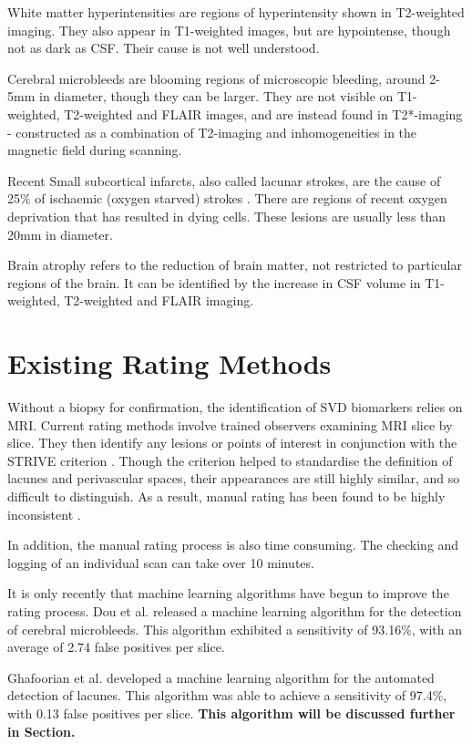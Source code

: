 White matter hyperintensities are regions of hyperintensity shown in T2-weighted imaging. They also appear in T1-weighted images, but are hypointense, though not as dark as CSF. Their cause is not well understood.

Cerebral microbleeds are blooming regions of microscopic bleeding, around 2-5mm in diameter, though they can be larger. They are not visible on T1-weighted, T2-weighted and FLAIR images, and are instead found in T2*-imaging - constructed as a combination of T2-imaging and inhomogeneities in the magnetic field during scanning. 

Recent Small subcortical infarcts, also called lacunar strokes, are the cause of 25\% of ischaemic (oxygen starved) strokes \cite{WardlawJ.M.2013Nsfr}. There are regions of recent oxygen deprivation that has resulted in dying cells. These lesions are usually less than 20mm in diameter. 

Brain atrophy refers to the reduction of brain matter, not restricted to particular regions of the brain. It can be identified by the increase in CSF volume in T1-weighted, T2-weighted and FLAIR imaging.


\section{Existing Rating Methods}\label{svd-rating}

Without a biopsy for confirmation, the identification of SVD biomarkers relies on MRI. Current rating methods involve trained observers examining MRI slice by slice. They then identify any lesions or points of interest in conjunction with the STRIVE criterion \cite{WardlawJ.M.2013Nsfr}. Though the criterion helped to standardise the definition of lacunes and perivascular spaces, their appearances are still highly similar, and so difficult to distinguish. As a result, manual rating has been found to be highly inconsistent \cite{PotterGillian2015CPSV}. 

In addition, the manual rating process is also time consuming. The checking and logging of an individual scan can take over 10 minutes.

It is only recently that machine learning algorithms have begun to improve the rating process. Dou et al. \cite{DouQ.2016ADoC} released a machine learning algorithm for the detection of cerebral microbleeds. This algorithm exhibited a sensitivity of 93.16\%, with an average of 2.74 false positives per slice. 

Ghafoorian et al. \cite{GhafoorianM.2017Dml3} developed a machine learning algorithm for the automated detection of lacunes. This algorithm was able to achieve a sensitivity of 97.4\%, with 0.13 false positives per slice. \textbf{This algorithm will be discussed further in Section.}


%
